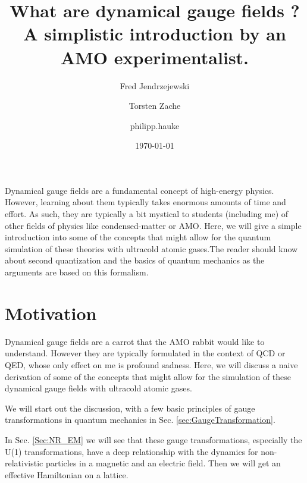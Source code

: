\documentclass[10pt]{article}
\renewenvironment{abstract}
  {{\bfseries\noindent{\abstractname}\par\nobreak}\footnotesize}
  {\bigskip}
\begin{document}
\title{What are dynamical gauge fields ? A simplistic introduction by an AMO experimentalist.}



\author[1]{Fred Jendrzejewski}%
\author[2]{Torsten Zache}%
\author[2]{philipp.hauke}%
%
%


\vspace{-1em}



  \date{\today}


\begingroup
\let\center\flushleft
\let\endcenter\endflushleft
\maketitle
\endgroup





\begin{abstract}
Dynamical gauge fields are a fundamental concept of high-energy physics. However, learning about them typically takes enormous amounts of time and effort. As such, they are typically a bit mystical to students (including me) of other fields of physics like condensed-matter or AMO. Here, we will give a simple introduction into some of the concepts that might allow for the quantum simulation of these theories with ultracold atomic gases.The reader should know about second quantization and the basics of quantum mechanics as the arguments are based on this formalism.%
\end{abstract}%



\sloppy


\section{Motivation}
Dynamical gauge fields are a carrot that the AMO rabbit would like to understand. However they are typically formulated in the context of QCD or QED, whose only effect on me is profound sadness. Here, we will discuss a naive derivation of some of the concepts that might allow for the simulation of these dynamical gauge fields with ultracold atomic gases.

We will start out the discussion, with a few basic principles of gauge transformations in quantum mechanics in Sec. \ref{sec:GaugeTransformation}.

In Sec. \ref{Sec:NR_EM} we will see that these gauge transformations, especially the U(1) transformations, have a deep relationship with the dynamics for non-relativistic particles in a magnetic and an electric field. Then we will get an effective Hamiltonian on a lattice. 
\end{document}
